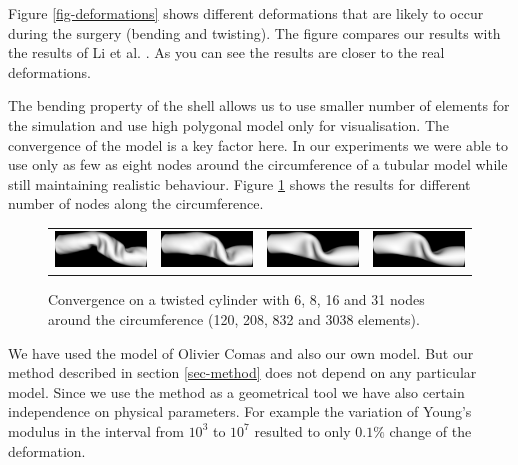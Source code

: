 Figure \ref{fig-deformations} shows different deformations that are likely to
occur during the surgery (bending and twisting). The figure compares our
results with the results of Li et al. \cite{Li2009}. As you can see the
results are closer to the real deformations.

The bending property of the shell allows us to use smaller number of
elements for the simulation and use high polygonal model only for
visualisation. The convergence of the model is a key factor here. In our
experiments we were able to use only as few as eight nodes around the
circumference of a tubular model while still maintaining realistic
behaviour. Figure \ref{fig-convergence} shows the results for different
number of nodes along the circumference.

\begin{figure}[tbh]
  \centering
  \begin{tabular}{cccc}
    \includegraphics[width=0.24\columnwidth]{img/twist-06-cg.png}
    &
    \includegraphics[width=0.24\columnwidth]{img/twist-08-cg.png}
    &
    \includegraphics[width=0.24\columnwidth]{img/twist-16-cg.png}
    &
    \includegraphics[width=0.24\columnwidth]{img/twist-31-cg.png}
  \end{tabular}
  \caption{Convergence on a twisted cylinder with 6, 8, 16 and 31 nodes
  around the circumference (120, 208, 832 and 3038 elements).
   } 
  \label{fig-convergence}
\end{figure}

We have used the model of Olivier Comas \cite{Comas2010b,Comas2010c} and
also our own model. But our method described in section \ref{sec-method}
does not depend on any particular model. Since we use the method as a
geometrical tool we have also certain independence on physical parameters.
For example the variation of Young's modulus in the interval from $10^3$ to
$10^7$ resulted to only $0.1\%$ change of the deformation.


